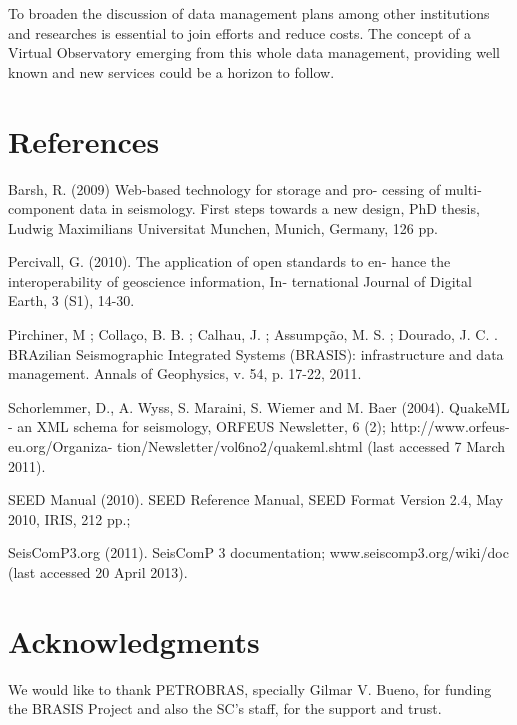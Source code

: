 \documentclass[twoside,letterpaper,twocolumn]{article}
\begin{document}
To broaden the discussion of data management plans among other institutions and researches is essential to join efforts and reduce costs. The concept of a Virtual Observatory emerging from this whole data management, providing well known and new services could be a horizon to follow.  


\section{References}

Barsh, R. (2009) Web-based technology for storage and pro- cessing of multi-component data in seismology. First steps towards a new design, PhD thesis, Ludwig Maximilians Universitat Munchen, Munich, Germany, 126 pp.

Percivall, G. (2010). The application of open standards to en- hance the interoperability of geoscience information, In- ternational Journal of Digital Earth, 3 (S1), 14-30.

Pirchiner, M ; Collaço, B. B. ; Calhau, J. ; Assumpção, M. S. ; Dourado, J. C. . BRAzilian Seismographic Integrated Systems (BRASIS): infrastructure and data management. Annals of Geophysics, v. 54, p. 17-22, 2011.

Schorlemmer, D., A. Wyss, S. Maraini, S. Wiemer and M. Baer (2004). QuakeML - an XML schema for seismology, ORFEUS Newsletter, 6 (2); http://www.orfeus-eu.org/Organiza- tion/Newsletter/vol6no2/quakeml.shtml (last accessed 7 March 2011).

SEED Manual (2010). SEED Reference Manual, SEED Format Version 2.4, May 2010, IRIS, 212 pp.; 

SeisComP3.org (2011). SeisComP 3 documentation; www.seiscomp3.org/wiki/doc (last accessed 20 April 2013).



\section{Acknowledgments}

We would like to thank PETROBRAS, specially Gilmar V. Bueno, for funding the BRASIS Project and also the SC's staff, for the support and trust.
\end{document}
